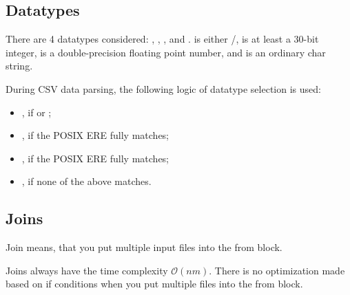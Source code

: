 \subsection{Datatypes}
There are 4 datatypes considered: , , , and . 
 is either /,  is at least a 30-bit integer,  is a double-precision floating point number, and  is an ordinary char string.

During CSV data parsing, the following logic of datatype selection is used:
\begin{itemize}
    \item {}, if  or ;
    \item {}, if the POSIX ERE \icode{[0-9]+} fully matches;
    \item {}, if the POSIX ERE  fully matches;
    \item {}, if none of the above matches.
\end{itemize}

\subsection{Joins}
Join means, that you put multiple input files into the from block.

Joins always have the time complexity $\mathcal{O}(nm)$. 
There is no optimization made based on if conditions when you put multiple files into the from block.

